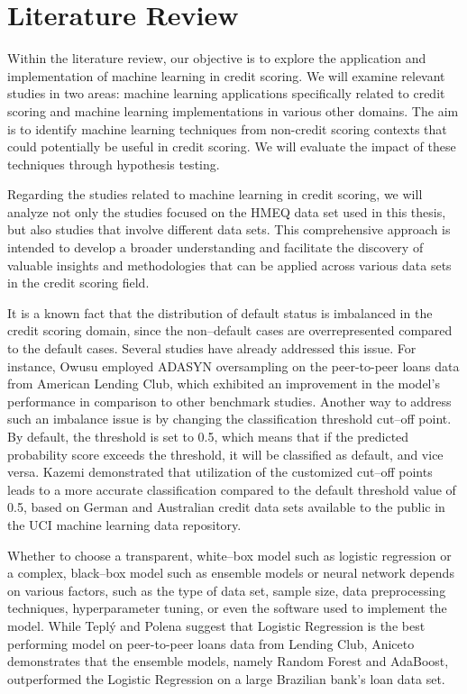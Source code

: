 \chapter{Literature Review}
\label{chap:three}

Within the literature review, our objective is to explore the application and implementation of machine learning in credit scoring.
We will examine relevant studies in two areas: machine learning applications specifically related to credit scoring and machine learning implementations in various other domains. The aim is to identify machine learning techniques from non-credit scoring contexts that could potentially be useful in credit scoring. We will evaluate the impact of these techniques through hypothesis testing.


Regarding the studies related to machine learning in credit scoring, we will analyze not only the studies focused on the HMEQ data set used in this thesis, but also studies that involve different data sets. This comprehensive approach is intended to develop a broader understanding and facilitate the discovery of valuable insights and methodologies that can be applied across various data sets in the credit scoring field.


It is a known fact that the distribution of default status is imbalanced in the credit scoring domain, since the non--default cases are overrepresented compared to the default cases. Several studies have already addressed this issue.
For instance, Owusu \citep{owusu2023deep} employed ADASYN oversampling on the peer-to-peer loans data from American Lending Club, which exhibited an improvement in the model's performance in comparison to other benchmark studies.
Another way to address such an imbalance issue is by changing the classification threshold cut--off point.
By default, the threshold is set to 0.5, which means that if the predicted probability score exceeds the threshold, it will be classified as default, and vice versa. Kazemi \citep{kazemi2023estimation} demonstrated that utilization of the customized cut--off points leads to a more accurate classification compared to the default threshold value of 0.5, based on German and Australian credit data sets available to the public in the UCI machine learning data repository.



Whether to choose a transparent, white--box model such as logistic regression or a complex, black--box model such as ensemble models or neural network depends on various factors, such as the type of data set, sample size, data preprocessing techniques, hyperparameter tuning, or even the software used to implement the model.
While Tepl\'{y} and Polena \citep{teply2020best} suggest that Logistic Regression is the best performing model on peer-to-peer loans data from Lending Club, Aniceto \citep{aniceto2020machine} demonstrates that the ensemble models, namely Random Forest and AdaBoost, outperformed the Logistic Regression on a large Brazilian bank's loan data set.




